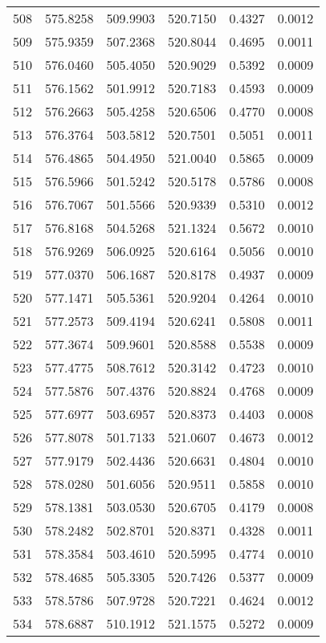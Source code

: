 \documentclass{article}
\begin{document}
\begin{longtable}{|c|c|c|c|c|c|}
508 & 575.8258 & 509.9903 & 520.7150 & 0.4327 & 0.0012 \\
509 & 575.9359 & 507.2368 & 520.8044 & 0.4695 & 0.0011 \\
510 & 576.0460 & 505.4050 & 520.9029 & 0.5392 & 0.0009 \\
511 & 576.1562 & 501.9912 & 520.7183 & 0.4593 & 0.0009 \\
512 & 576.2663 & 505.4258 & 520.6506 & 0.4770 & 0.0008 \\
513 & 576.3764 & 503.5812 & 520.7501 & 0.5051 & 0.0011 \\
514 & 576.4865 & 504.4950 & 521.0040 & 0.5865 & 0.0009 \\
515 & 576.5966 & 501.5242 & 520.5178 & 0.5786 & 0.0008 \\
516 & 576.7067 & 501.5566 & 520.9339 & 0.5310 & 0.0012 \\
517 & 576.8168 & 504.5268 & 521.1324 & 0.5672 & 0.0010 \\
518 & 576.9269 & 506.0925 & 520.6164 & 0.5056 & 0.0010 \\
519 & 577.0370 & 506.1687 & 520.8178 & 0.4937 & 0.0009 \\
520 & 577.1471 & 505.5361 & 520.9204 & 0.4264 & 0.0010 \\
521 & 577.2573 & 509.4194 & 520.6241 & 0.5808 & 0.0011 \\
522 & 577.3674 & 509.9601 & 520.8588 & 0.5538 & 0.0009 \\
523 & 577.4775 & 508.7612 & 520.3142 & 0.4723 & 0.0010 \\
524 & 577.5876 & 507.4376 & 520.8824 & 0.4768 & 0.0009 \\
525 & 577.6977 & 503.6957 & 520.8373 & 0.4403 & 0.0008 \\
526 & 577.8078 & 501.7133 & 521.0607 & 0.4673 & 0.0012 \\
527 & 577.9179 & 502.4436 & 520.6631 & 0.4804 & 0.0010 \\
528 & 578.0280 & 501.6056 & 520.9511 & 0.5858 & 0.0010 \\
529 & 578.1381 & 503.0530 & 520.6705 & 0.4179 & 0.0008 \\
530 & 578.2482 & 502.8701 & 520.8371 & 0.4328 & 0.0011 \\
531 & 578.3584 & 503.4610 & 520.5995 & 0.4774 & 0.0010 \\
532 & 578.4685 & 505.3305 & 520.7426 & 0.5377 & 0.0009 \\
533 & 578.5786 & 507.9728 & 520.7221 & 0.4624 & 0.0012 \\
534 & 578.6887 & 510.1912 & 521.1575 & 0.5272 & 0.0009 \\

\end{longtable}
\end{document}
